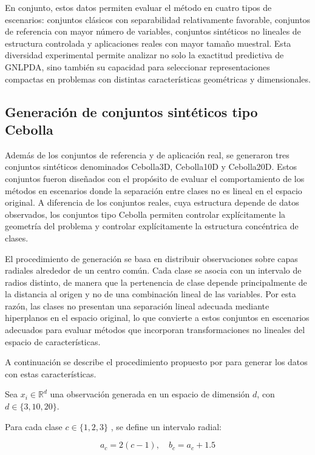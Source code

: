 En conjunto, estos datos permiten evaluar el método en cuatro tipos de escenarios: conjuntos clásicos con separabilidad relativamente favorable, conjuntos de referencia con mayor número de variables, conjuntos sintéticos no lineales de estructura controlada y aplicaciones reales con mayor tamaño muestral. Esta diversidad experimental permite analizar no solo la exactitud predictiva de GNLPDA, sino también su capacidad para seleccionar representaciones compactas en problemas con distintas características geométricas y dimensionales.

\subsection{Generación de conjuntos sintéticos tipo Cebolla}

Además de los conjuntos de referencia y de aplicación real, se generaron tres conjuntos sintéticos denominados Cebolla3D, Cebolla10D y Cebolla20D. Estos conjuntos fueron diseñados con el propósito de evaluar el comportamiento de los métodos en escenarios donde la separación entre clases no es lineal en el espacio original. A diferencia de los conjuntos reales, cuya estructura depende de datos observados, los conjuntos tipo Cebolla permiten controlar explícitamente la geometría del problema y controlar explícitamente la estructura concéntrica de clases.

El procedimiento de generación se basa en distribuir observaciones sobre capas radiales alrededor de un centro común. Cada clase se asocia con un intervalo de radios distinto, de manera que la pertenencia de clase depende principalmente de la distancia al origen y no de una combinación lineal de las variables. Por esta razón, las clases no presentan una separación lineal adecuada mediante hiperplanos en el espacio original, lo que convierte a estos conjuntos en escenarios adecuados para evaluar métodos que incorporan transformaciones no lineales del espacio de características.

A continuación se describe el procedimiento propuesto por \cite{marsaglia1972choosing} para generar los datos con estas características.

Sea $x_i \in \mathbb{R}^d$ una observación generada en un espacio de dimensión $d$, con $d \in \{3,10,20\}$.

Para cada clase $c \in \{1,2,3\}$ , se define un intervalo radial:

\begin{equation}
	a_c = 2(c-1), \quad b_c = a_c + 1.5
	\label{eq:EM15}
\end{equation}

